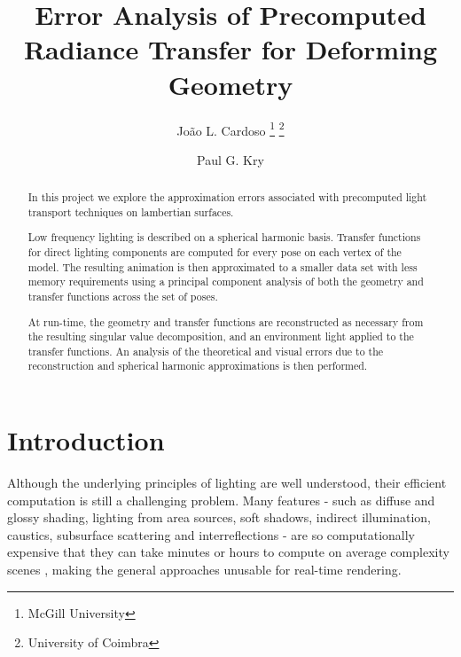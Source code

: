 \documentclass[annual]{acmsiggraph}
\title{Error Analysis of Precomputed Radiance Transfer for Deforming
Geometry}
\author{João L. Cardoso \thanks{McGill University} \space \thanks{University of Coimbra} \and Paul G. Kry \footnotemark[1]}
\begin{document}

\maketitle

\begin{abstract}

In this project we explore the approximation errors associated with precomputed light transport techniques on lambertian surfaces.

Low frequency lighting is described on a spherical harmonic basis. Transfer functions for direct lighting components are computed for every pose on each vertex of the model. The resulting animation is then approximated to a smaller data set with less memory requirements using a principal component analysis of both the geometry and transfer functions across the set of poses.

At run-time, the geometry and transfer functions are reconstructed as necessary from the resulting singular value decomposition, and an environment light applied to the transfer functions. An analysis of the theoretical and visual errors due to the reconstruction and spherical harmonic approximations is then performed.

\end{abstract}

\keywordlist
\copyrightspace

\section{Introduction}

Although the underlying principles of lighting are well understood, their efficient computation is still a challenging problem. Many features - such as diffuse and glossy shading, lighting from area sources, soft shadows, indirect illumination, caustics, subsurface scattering and interreflections - are so computationally expensive that they can take minutes or hours to compute on average complexity scenes , making the general approaches unusable for real-time rendering.
\end{document}
